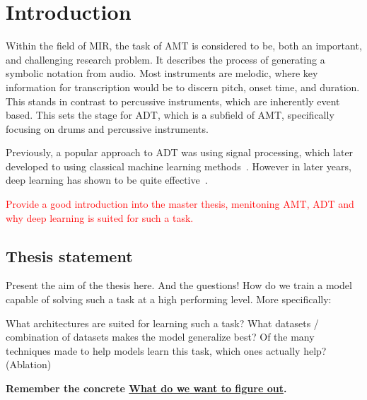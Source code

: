 \chapter{Introduction}

Within the field of \gls{MIR}, the task of \gls{AMT} is considered to be, both an important, and challenging research problem. It describes the process of generating a symbolic notation from audio. Most instruments are melodic, where key information for transcription would be to discern pitch, onset time, and duration. This stands in contrast to percussive instruments, which are inherently event based. This sets the stage for \gls{ADT}, which is a subfield of \gls{AMT}, specifically focusing on drums and percussive instruments.~\cite{8350302}

Previously, a popular approach to \gls{ADT} was using signal processing, which later developed to using classical machine learning methods~\cite{8350302}. However in later years, deep learning has shown to be quite effective~\cite{signals4040042}.

\textcolor{red}{Provide a good introduction into the master thesis, menitoning \gls{AMT}, \gls{ADT} and why deep learning is suited for such a task.}

\section{Thesis statement}

Present the aim of the thesis here. And the \b{questions!}
How do we train a model capable of solving such a task at a high performing level. More specifically:

What architectures are suited for learning such a task?
What datasets / combination of datasets makes the model generalize best?
Of the many techniques made to help models learn this task, which ones actually help? (Ablation)

\textbf{Remember the concrete \underline{What do we want to figure out}.}